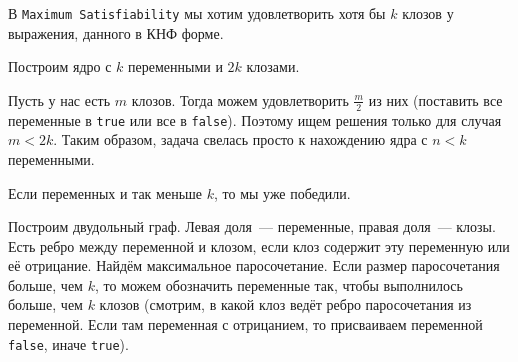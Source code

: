 \documentclass[12pt]{article}
\theoremstyle{definition} %
\newtheorem{Thm}{\underline{Теорема}}[subsection] %
\theoremstyle{plain} %
\newtheorem{Def}[Thm]{Def} %
\theoremstyle{remark} %
\begin{document}
\begin{comment}

\begin{Def} {\bf Коронной декомпозицией графа $G$} называется такое разбиение вершин на $С$ (Crown), $H$ (Head), $R$ (Rest), что
\begin{itemize}
  \item $G=C\sqcup H\sqcup R$
  \item $C\neq\emptyset$
  \item $C$~--- независимое множество
  \item Нет рёбер между $C$ и $R$
  \item В $C\sqcup H$ есть паросочетание, насыщающее $H$, на рёбрах между $C$ и $H$
\end{itemize}
\end{Def}

\begin{Thm} Пусть $G$~--- граф без изолированных вершин, содержащий по крайней мере $3k+1$ вершину. Существет полиномиальный алгоритм, который
\begin{itemize}
  \item либо находит совершенное паросочетание размера $k+1$ в $G$
  \item либо находит коронную декомпозицию графа $G$
\end{itemize}
\end{Thm}
\end{comment}

В {\tt Maximum Satisfiability} мы хотим удовлетворить хотя бы $k$ клозов у выражения, данного в КНФ форме.

Построим ядро с $k$ переменными и $2k$ клозами.

Пусть у нас есть $m$ клозов. Тогда можем удовлетворить $\frac{m}{2}$ из них (поставить все переменные в {\tt true} или все в {\tt false}). Поэтому ищем решения только для случая $m<2k$. Таким образом, задача свелась просто к нахождению ядра с $n<k$ переменными.

Если переменных и так меньше $k$, то мы уже победили.

Построим двудольный граф. Левая доля~--- переменные, правая доля~--- клозы. Есть ребро между переменной и клозом, если клоз содержит эту переменную или её отрицание. Найдём максимальное паросочетание. Если размер паросочетания больше, чем $k$, то можем обозначить переменные так, чтобы выполнилось больше, чем $k$ клозов (смотрим, в какой клоз ведёт ребро паросочетания из переменной. Если там переменная с отрицанием, то присваиваем переменной {\tt false}, иначе {\tt true}).
\end{document}

